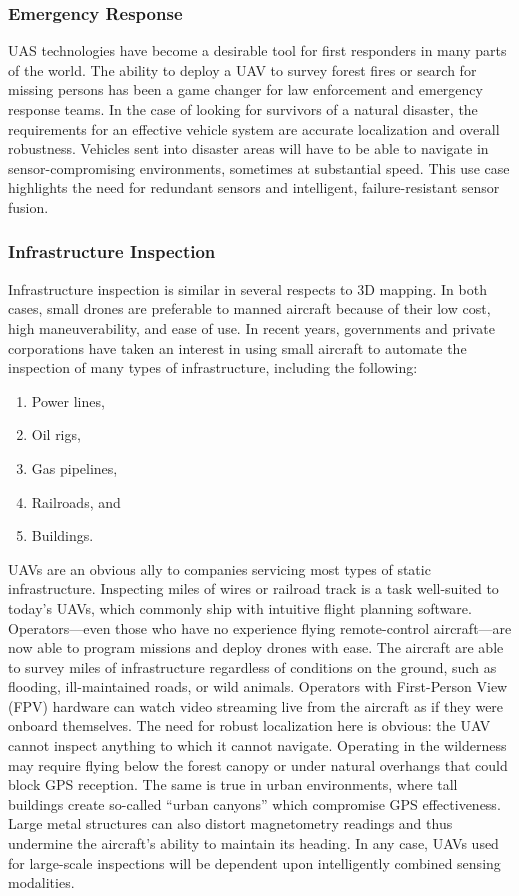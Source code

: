 \subsubsection{Emergency Response}

UAS technologies have become a desirable tool for first responders in many parts of the world. The ability to deploy a UAV to survey forest fires or search for missing persons has been a game changer for law enforcement and emergency response teams. In the case of looking for survivors of a natural disaster, the requirements for an effective vehicle system are accurate localization and overall robustness. Vehicles sent into disaster areas will have to be able to navigate in sensor-compromising environments, sometimes at substantial speed. This use case highlights the need for redundant sensors and intelligent, failure-resistant sensor fusion.

\subsubsection{Infrastructure Inspection}

Infrastructure inspection is similar in several respects to 3D mapping. In both cases, small drones are preferable to manned aircraft because of their low cost, high maneuverability, and ease of use. In recent years, governments and private corporations have taken an interest in using small aircraft to automate the inspection of many types of infrastructure, including the following:
\begin{enumerate}
    \item Power lines,
    \item Oil rigs,
    \item Gas pipelines,
    \item Railroads, and
    \item Buildings.
\end{enumerate}
UAVs are an obvious ally to companies servicing most types of static infrastructure. Inspecting miles of wires or railroad track is a task well-suited to today's UAVs, which commonly ship with intuitive flight planning software. Operators---even those who have no experience flying remote-control aircraft---are now able to program missions and deploy drones with ease. The aircraft are able to survey miles of infrastructure regardless of conditions on the ground, such as flooding, ill-maintained roads, or wild animals. Operators with First-Person View (FPV) hardware can watch video streaming live from the aircraft as if they were onboard themselves. The need for robust localization here is obvious: the UAV cannot inspect anything to which it cannot navigate. Operating in the wilderness may require flying below the forest canopy or under natural overhangs that could block GPS reception. The same is true in urban environments, where tall buildings create so-called ``urban canyons'' which compromise GPS effectiveness. Large metal structures can also distort magnetometry readings and thus undermine the aircraft's ability to maintain its heading. In any case, UAVs used for large-scale inspections will be dependent upon intelligently combined sensing modalities.

